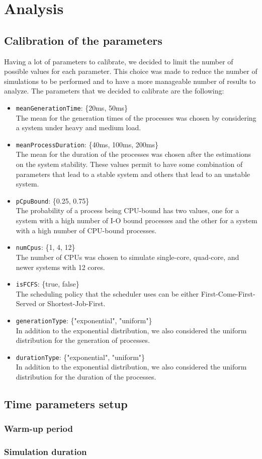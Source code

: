 \chapter{Analysis}

\section{Calibration of the parameters}

Having a lot of parameters to calibrate, we decided to limit the number of possible values for each parameter. This choice was made to reduce the number of simulations to be performed and to have a more manageable number of results to analyze. The parameters that we decided to calibrate are the following:

\begin{itemize}
    \item \texttt{meanGenerationTime}: \{20ms, 50ms\} \\
    The mean for the generation times of the processes was chosen by considering a system under heavy and medium load.
    \item \texttt{meanProcessDuration}: \{40ms, 100ms, 200ms\} \\
    The mean for the duration of the processes was chosen after the estimations on the system stability. These values permit to have some combination of parameters that lead to a stable system and others that lead to an unstable system.
    \item \texttt{pCpuBound}: \{0.25, 0.75\} \\
    The probability of a process being CPU-bound has two values, one for a system with a high number of I-O bound processes and the other for a system with a high number of CPU-bound processes.
    \item \texttt{numCpus}: \{1, 4, 12\} \\
    The number of CPUs was chosen to simulate single-core, quad-core, and newer systems with 12 cores.
    \item \texttt{isFCFS}: \{true, false\} \\
    The scheduling policy that the scheduler uses can be either First-Come-First-Served or Shortest-Job-First.
    \item \texttt{generationType}: \{"exponential", "uniform"\} \\
    In addition to the exponential distribution, we also considered the uniform distribution for the generation of processes.
    \item \texttt{durationType}: \{"exponential", "uniform"\} \\
    In addition to the exponential distribution, we also considered the uniform distribution for the duration of the processes.
\end{itemize}


\section{Time parameters setup}

\subsection{Warm-up period}


\subsection{Simulation duration}